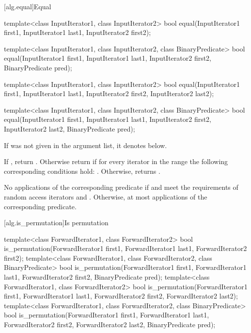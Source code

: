 [alg.equal]{Equal}

%
\begin{itemdecl}
template<class InputIterator1, class InputIterator2>
  bool equal(InputIterator1 first1, InputIterator1 last1,
             InputIterator2 first2);

template<class InputIterator1, class InputIterator2,
          class BinaryPredicate>
  bool equal(InputIterator1 first1, InputIterator1 last1,
             InputIterator2 first2, BinaryPredicate pred);

template<class InputIterator1, class InputIterator2>
  bool equal(InputIterator1 first1, InputIterator1 last1,
             InputIterator2 first2, InputIterator2 last2);

template<class InputIterator1, class InputIterator2,
           class BinaryPredicate>
  bool equal(InputIterator1 first1, InputIterator1 last1,
             InputIterator2 first2, InputIterator2 last2,
             BinaryPredicate pred);
\end{itemdecl}

\begin{itemdescr}
\pnum
\remarks If  was not given in the argument list, it denotes
 below.

\pnum
\returns
If
,
return
.
Otherwise return
if for every iterator
in the range 
the following corresponding conditions hold:
.
Otherwise, returns
.

\pnum
\complexity
No applications of the corresponding predicate if
and
meet the requirements of random access iterators and
.
Otherwise, at most
applications of the corresponding predicate.
\end{itemdescr}

[alg.is_permutation]{Is permutation}

%
\begin{itemdecl}
template<class ForwardIterator1, class ForwardIterator2>
  bool is_permutation(ForwardIterator1 first1, ForwardIterator1 last1,
                      ForwardIterator2 first2);
template<class ForwardIterator1, class ForwardIterator2,
                 class BinaryPredicate>
  bool is_permutation(ForwardIterator1 first1, ForwardIterator1 last1,
                      ForwardIterator2 first2, BinaryPredicate pred);
template<class ForwardIterator1, class ForwardIterator2>
  bool is_permutation(ForwardIterator1 first1, ForwardIterator1 last1,
                      ForwardIterator2 first2, ForwardIterator2 last2);
template<class ForwardIterator1, class ForwardIterator2,
                 class BinaryPredicate>
  bool is_permutation(ForwardIterator1 first1, ForwardIterator1 last1,
                      ForwardIterator2 first2, ForwardIterator2 last2,
                      BinaryPredicate pred);
\end{itemdecl}

